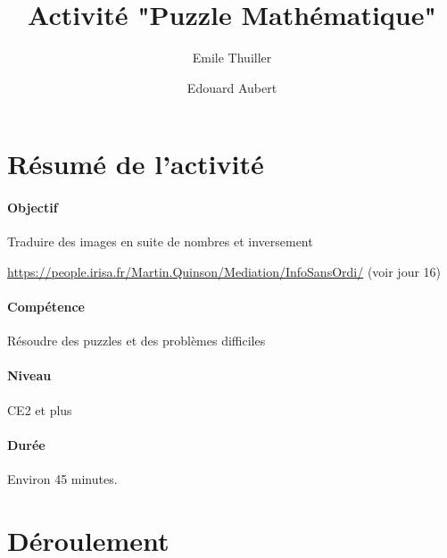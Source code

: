 \documentclass[a4paper,11pt]{article}%
\title{Activité "Puzzle Mathématique"}%
\author{Emile Thuiller \and Edouard Aubert}%
\date{}%
\begin{document}
%

\maketitle%

\section{Résumé de l'activité}

\paragraph{Objectif}
Traduire des images en suite de nombres et inversement

\url{https://people.irisa.fr/Martin.Quinson/Mediation/InfoSansOrdi/} (voir jour 16)

\paragraph{Compétence}
Résoudre des puzzles et des problèmes difficiles

\paragraph{Niveau}
CE2 et plus


\paragraph{Durée}
Environ 45 minutes.

\section{Déroulement}
\end{document}
